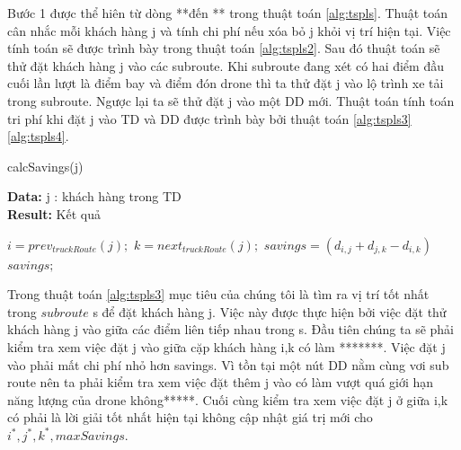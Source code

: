\documentclass[a4paper,12pt]{report}
\begin{document}
Bước 1 được thể hiên từ dòng **đến ** trong thuật toán \ref{alg:tspls}. Thuật toán cân nhắc mỗi khách hàng j và tính chi phí nếu xóa bỏ j khỏi vị trí hiện tại. Việc tính toán sẽ được trình bày trong thuật toán \ref{alg:tspls2}. Sau đó thuật toán sẽ thử đặt khách hàng j vào các subroute. Khi subroute đang xét có hai điểm đầu cuối lần lượt là điểm bay và điểm đón drone thì ta thử đặt j vào lộ trình xe tải trong subroute. Ngược lại ta sẽ thử đặt j vào một DD mới. Thuật toán tính toán tri phí khi đặt j vào TD và DD được trình bày bởi thuật toán \ref{alg:tspls3} \ref{alg:tspls4}.   \\

\begin{algorithm}[H]
\caption{calcSavings(j)}
\textbf{Data:} j : khách hàng trong TD\\
\textbf{Result:} Kết quả
\begin{algorithmic}[1]
\State $i=prev_{truckRoute}(j);$
\State $k=next_{truckRoute}(j);$
\State $savings=(d_{i,j}+d_{j,k}-d_{i,k})$
\Return $savings;$
\end{algorithmic}

\label{alg:tspls2}
\end{algorithm}

Trong thuật toán \ref{alg:tspls3} mục tiêu của chúng tôi là tìm ra vị trí tốt nhất trong $subroute$ s để đặt khách hàng j. Việc này được thực hiện bởi việc đặt thử khách hàng j vào giữa các điểm liên tiếp nhau trong s. Đầu tiên chúng ta sẽ phải kiểm tra xem việc đặt j vào giữa cặp khách hàng i,k có làm *******. Việc đặt j vào phải mất chi phí nhỏ hơn savings. Vì tồn tại một nút DD nằm cùng vơi sub route nên ta phải kiểm tra xem việc đặt thêm j vào có làm vượt quá giới hạn năng lượng của drone không*****. Cuối cùng kiểm tra xem việc đặt j ở giữa i,k  có phải là lời giải tốt nhất hiện tại không cập nhật giá trị mới cho $i^*,j^*,k^*, maxSavings$.\\
\end{document}
